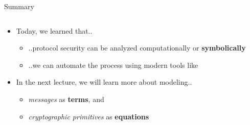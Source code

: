 \documentclass[11pt,aspectratio=169]{beamer}
\begin{document}
\begin{frame}[fragile]{Summary}
    \begin{columns}
        \begin{column}{0.65\textwidth}
            \begin{itemize}
                \item Today, we learned that..
                \begin{itemize}
                    \item ..protocol security can be analyzed computationally
                          or \textbf{symbolically}
                    \item ..we can automate the process using modern tools like 
                          \textbf{\Tamarin}
                \end{itemize}
                \item In the next lecture, we will learn more about modeling..
                \begin{itemize}
                    \item \textit{messages} as \textbf{terms}, and
                    \item \textit{cryptographic primitives} as
                          \textbf{equations}
                \end{itemize}
            \end{itemize}
        \end{column}
\end{columns}
\end{frame}
\end{document}
